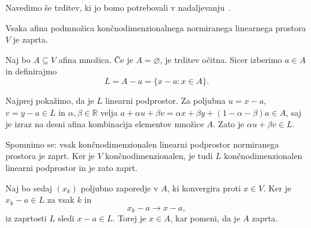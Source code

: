 \documentclass[mat2, tisk]{fmfdelo}
\newcommand{\R}{\mathbb{R}}
\begin{document}
Navedimo še trditev, ki jo bomo potrebovali v nadaljevanju~\cite{KumarAffine}.

\begin{trditev}\label{ZaprtaAfina}
  Vsaka afina podmnožica končnodimenzionalnega normiranega linearnega prostora $V$ je zaprta.
\end{trditev}

\begin{dokaz}
Naj bo $A\subseteq V$ afina množica.
Če je $A=\varnothing$, je trditev očitna.
Sicer izberimo $a\in A$ in definirajmo
\[
L=A-a=\{x-a:x\in A\}.
\]

Najprej pokažimo, da je $L$ linearni podprostor.
Za poljubna $u=x-a$, $v=y-a\in L$ in
$\alpha,\beta\in\R$ velja
$a+\alpha u+\beta v
=\alpha x+\beta y+(1-\alpha-\beta)a\in A$,
saj je izraz na desni afina kombinacija
elementov množice $A$.
Zato je $\alpha u+\beta v\in L$.

Spomnimo se: vsak končnodimenzionalen linearni podprostor normiranega prostora 
je zaprt. Ker je $V$ končnodimenzionalen, je tudi
$L$ končnodimenzionalen linearni podprostor
in je zato zaprt.

Naj bo sedaj $(x_k)$ poljubno zaporedje v $A$,
ki konvergira proti $x\in V$.
Ker je $x_k-a\in L$ za vsak $k$ in
\[
x_k-a\longrightarrow x-a,
\]
iz zaprtosti $L$ sledi $x-a\in L$.
Torej je $x\in A$, kar pomeni, da je
$A$ zaprta.
\end{dokaz}
\end{document}
